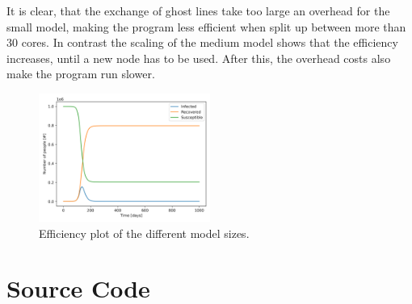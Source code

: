 \documentclass{article}
\begin{document}
It is clear, that the exchange of ghost lines take too large an overhead for the small model, making the program less efficient when split up between more than 30 cores. In contrast the scaling of the medium model shows that the efficiency increases, until a new node has to be used. After this, the overhead costs also make the program run slower.


\begin{figure}
    \centering
    \includegraphics[width=0.5\textwidth]{Assignment_1_SIR/Report/Images/SIR_plot_dt0_001_pop1e6.png}
    \caption{Efficiency plot of the different model sizes.}
    \label{fig:Efficiency_plot}
\end{figure}
\FloatBarrier
\section{Source Code}
\label{sec:source}

\end{document}

